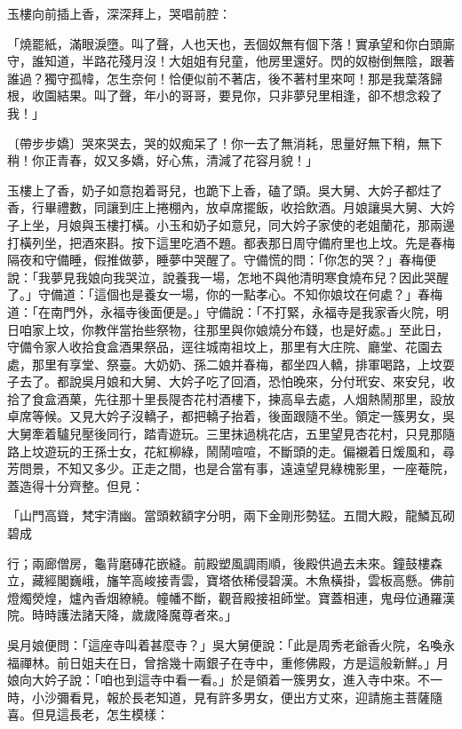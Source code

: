 玉樓向前插上香，深深拜上，哭唱前腔：

「燒罷紙，滿眼淚墮。叫了聲，人也天也，丟個奴無有個下落！實承望和你白頭廝守，誰知道，半路花殘月沒！大姐姐有兒童，他房里還好。閃的奴樹倒無陰，跟著誰過？獨守孤幃，怎生奈何！恰便似前不著店，後不著村里來呵！那是我葉落歸根，收園結果。叫了聲，年小的哥哥，要見你，只非夢兒里相逢，卻不想念殺了我！」

〔帶步步嬌〕哭來哭去，哭的奴痴呆了！你一去了無消耗，思量好無下稍，無下稍！你正青春，奴又多嬌，好心焦，清減了花容月貌！」

玉樓上了香，奶子如意抱着哥兒，也跪下上香，磕了頭。吳大舅、大妗子都炷了香，行畢禮數，同讓到庄上捲棚內，放卓席擺飯，收拾飲酒。月娘讓吳大舅、大妗子上坐，月娘與玉樓打橫。小玉和奶子如意兒，同大妗子家使的老姐蘭花，那兩邊打橫列坐，把酒來斟。按下這里吃酒不題。都表那日周守備府里也上坟。先是春梅隔夜和守備睡，假推做夢，睡夢中哭醒了。守備慌的問：「你怎的哭？」春梅便說：「我夢見我娘向我哭泣，說養我一場，怎地不與他清明寒食燒布兒？因此哭醒了。」守備道：「這個也是養女一場，你的一點孝心。不知你娘坟在何處？」春梅道：「在南門外，永福寺後面便是。」守備說：「不打緊，永福寺是我家香火院，明日咱家上坟，你教伴當抬些祭物，往那里與你娘燒分布錢，也是好處。」至此日，守備令家人收拾食盒酒果祭品，逕往城南祖坟上，那里有大庄院、廳堂、花園去處，那里有享堂、祭臺。大奶奶、孫二娘并春梅，都坐四人轎，排軍喝路，上坟耍子去了。都說吳月娘和大舅、大妗子吃了回酒，恐怕晚來，分付玳安、來安兒，收拾了食盒酒菓，先往那十里長隄杏花村酒樓下，揀高阜去處，人烟熱鬧那里，設放卓席等候。又見大妗子沒轎子，都把轎子抬着，後面跟隨不坐。領定一簇男女，吳大舅牽着驢兒壓後同行，踏青遊玩。三里抹過桃花店，五里望見杏花村，只見那隨路上坟遊玩的王孫士女，花紅柳綠，鬧鬧喧喧，不斷頭的走。偏襯着日煖風和，尋芳問景，不知又多少。正走之間，也是合當有事，遠遠望見綠槐影里，一座菴院，蓋造得十分齊整。但見：

「山門高聳，梵宇清幽。當頭敕額字分明，兩下金剛形勢猛。五間大殿，龍鱗瓦砌碧成

行；兩廊僧房，龜背磨磚花嵌縫。前殿塑風調雨順，後殿供過去未來。鐘鼓樓森立，藏經閣巍峨，旛竿高峻接青雲，寶塔依稀侵碧漢。木魚橫掛，雲板高懸。佛前燈燭熒煌，爐內香烟繚繞。幢幡不斷，觀音殿接祖師堂。寶蓋相連，鬼母位通羅漢院。時時護法諸天降，歲歲降魔尊者來。」

吳月娘便問：「這座寺叫着甚麼寺？」吳大舅便說：「此是周秀老爺香火院，名喚永福禪林。前日姐夫在日，曾捨幾十兩銀子在寺中，重修佛殿，方是這般新鮮。」月娘向大妗子說：「咱也到這寺中看一看。」於是領着一簇男女，進入寺中來。不一時，小沙彌看見，報於長老知道，見有許多男女，便出方丈來，迎請施主菩薩隨喜。但見這長老，怎生模樣：

